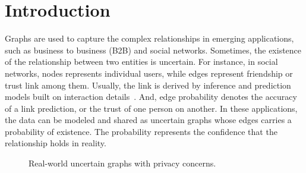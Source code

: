 \section{Introduction}

\label{sec:Intro}

Graphs are used to capture the complex relationships in emerging applications, such as business to business (B2B) and social networks. 
Sometimes, the existence of the relationship between two entities is uncertain. For instance, in social networks, nodes represents individual users, while edges represent friendship or trust link among them.  Usually, the link is derived by inference and prediction models built on interaction details~\cite{Lin_B2B,Adar_Managing_2007,Kempe_Maximizing_2003}. And, edge probability denotes the accuracy of a link prediction, or the trust of one person on another. 
In these applications, the data can be modeled and shared as uncertain graphs whose edges carries a probability of existence. The probability represents the confidence that the relationship holds in reality. 

\begin{figure}[!htb]
  \vspace{-7pt}
    \vspace{-7pt}
    \caption{Real-world uncertain graphs with privacy concerns.}
    \label{fig:motivation}
    \vspace{-7pt}
\end{figure} 

